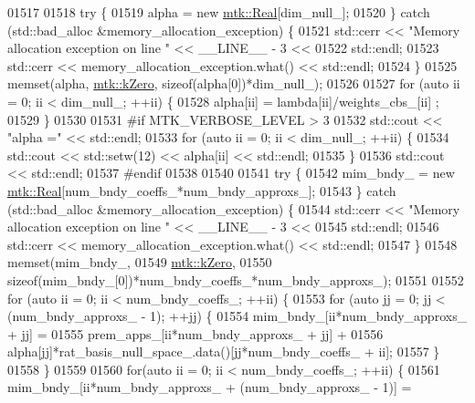 \begin{DoxyCode}
{{01517 
01518   \textcolor{keywordflow}{try} \{
01519     alpha = \textcolor{keyword}{new} \hyperlink{group__c01-roots_gac080bbbf5cbb5502c9f00405f894857d}{mtk::Real}[dim\_null\_];
01520   \} \textcolor{keywordflow}{catch} (std::bad\_alloc &memory\_allocation\_exception) \{
01521     std::cerr << \textcolor{stringliteral}{"Memory allocation exception on line "} << \_\_LINE\_\_ - 3 <<
01522       std::endl;
01523     std::cerr << memory\_allocation\_exception.what() << std::endl;
01524   \}
01525   memset(alpha, \hyperlink{group__c01-roots_ga59a451a5fae30d59649bcda274fea271}{mtk::kZero}, \textcolor{keyword}{sizeof}(alpha[0])*dim\_null\_);
01526 
01527   \textcolor{keywordflow}{for} (\textcolor{keyword}{auto} ii = 0; ii < dim\_null\_; ++ii) \{
01528     alpha[ii] = lambda[ii]/weights\_cbs\_[ii] ;
01529   \}
01530 
01531 \textcolor{preprocessor}{  #if MTK\_VERBOSE\_LEVEL > 3}
01532   std::cout << \textcolor{stringliteral}{"alpha ="} << std::endl;
01533   \textcolor{keywordflow}{for} (\textcolor{keyword}{auto} ii = 0; ii < dim\_null\_; ++ii) \{
01534     std::cout << std::setw(12) << alpha[ii] << std::endl;
01535   \}
01536   std::cout << std::endl;
01537 \textcolor{preprocessor}{  #endif}
01538 
01540 
01541   \textcolor{keywordflow}{try} \{
01542     mim\_bndy\_ = \textcolor{keyword}{new} \hyperlink{group__c01-roots_gac080bbbf5cbb5502c9f00405f894857d}{mtk::Real}[num\_bndy\_coeffs\_*num\_bndy\_approxs\_];
01543   \} \textcolor{keywordflow}{catch} (std::bad\_alloc &memory\_allocation\_exception) \{
01544     std::cerr << \textcolor{stringliteral}{"Memory allocation exception on line "} << \_\_LINE\_\_ - 3 <<
01545       std::endl;
01546     std::cerr << memory\_allocation\_exception.what() << std::endl;
01547   \}
01548   memset(mim\_bndy\_,
01549          \hyperlink{group__c01-roots_ga59a451a5fae30d59649bcda274fea271}{mtk::kZero},
01550          \textcolor{keyword}{sizeof}(mim\_bndy\_[0])*num\_bndy\_coeffs\_*num\_bndy\_approxs\_);
01551 
01552   \textcolor{keywordflow}{for} (\textcolor{keyword}{auto} ii = 0; ii < num\_bndy\_coeffs\_; ++ii) \{
01553     \textcolor{keywordflow}{for} (\textcolor{keyword}{auto} jj = 0; jj < (num\_bndy\_approxs\_ - 1); ++jj) \{
01554       mim\_bndy\_[ii*num\_bndy\_approxs\_ + jj] =
01555         prem\_apps\_[ii*num\_bndy\_approxs\_ + jj] +
01556         alpha[jj]*rat\_basis\_null\_space\_.data()[jj*num\_bndy\_coeffs\_ + ii];
01557     \}
01558   \}
01559 
01560   \textcolor{keywordflow}{for}(\textcolor{keyword}{auto} ii = 0; ii < num\_bndy\_coeffs\_; ++ii) \{
01561     mim\_bndy\_[ii*num\_bndy\_approxs\_ + (num\_bndy\_approxs\_ - 1)] =
}}
\end{DoxyCode}
